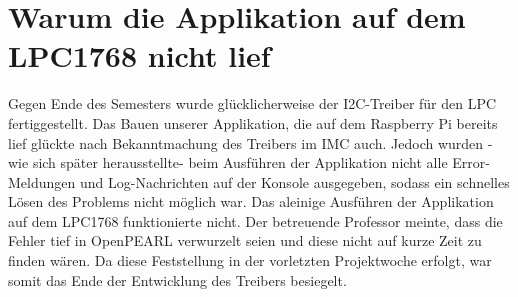 \chapter{Warum die Applikation auf dem LPC1768 nicht lief}
Gegen Ende des Semesters wurde glücklicherweise der I2C-Treiber für den LPC fertiggestellt. Das Bauen unserer Applikation, die auf dem Raspberry Pi bereits lief glückte nach Bekanntmachung des Treibers im IMC auch. Jedoch wurden -wie sich später herausstellte- beim Ausführen der Applikation nicht alle Error-Meldungen und Log-Nachrichten auf der Konsole ausgegeben, sodass ein schnelles Lösen des Problems nicht möglich war. Das aleinige Ausführen der Applikation auf dem LPC1768 funktionierte nicht. Der betreuende Professor meinte, dass die Fehler tief in OpenPEARL verwurzelt seien und diese nicht auf kurze Zeit zu finden wären. Da diese Feststellung in der vorletzten Projektwoche erfolgt, war somit das Ende der Entwicklung des Treibers besiegelt.
